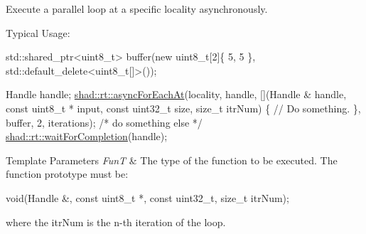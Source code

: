 Execute a parallel loop at a specific locality asynchronously. 

Typical Usage\-: 
\begin{DoxyCode}
std::shared\_ptr<uint8\_t> buffer(\textcolor{keyword}{new} uint8\_t[2]\{ 5, 5 \},
                                std::default\_delete<uint8\_t[]>());

Handle handle;
\hyperlink{namespaceshad_1_1rt_a36e675e25238d9b5c81b8a755dce61cd}{shad::rt::asyncForEachAt}(locality,
    handle,
    [](Handle & handle, \textcolor{keyword}{const} uint8\_t * input, \textcolor{keyword}{const} uint32\_t size,
       \textcolor{keywordtype}{size\_t} itrNum) \{
      \textcolor{comment}{// Do something.}
    \},
    buffer, 2,
    iterations);
\textcolor{comment}{/* do something else */}
\hyperlink{namespaceshad_1_1rt_a6ea1d3672bac3a80032863b6732a0c0a}{shad::rt::waitForCompletion}(handle);
\end{DoxyCode}



\begin{DoxyTemplParams}{Template Parameters}
{\em Fun\-T} & The type of the function to be executed. The function prototype must be\-: 
\begin{DoxyCode}
void(Handle &, \textcolor{keyword}{const} uint8\_t *, \textcolor{keyword}{const} uint32\_t, \textcolor{keywordtype}{size\_t} itrNum);
\end{DoxyCode}
 where the itr\-Num is the n-\/th iteration of the loop.\\
\hline
\end{DoxyTemplParams}

